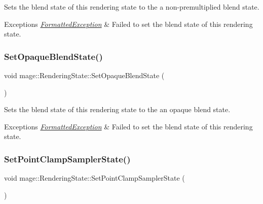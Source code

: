 Sets the blend state of this rendering state to the a non-\/premultiplied blend state.


\begin{DoxyExceptions}{Exceptions}
{\em \hyperlink{structmage_1_1_formatted_exception}{Formatted\+Exception}} & Failed to set the blend state of this rendering state. \\
\hline
\end{DoxyExceptions}
\hypertarget{structmage_1_1_rendering_state_ab0f578405f3c880234757e152be1a670}{}\label{structmage_1_1_rendering_state_ab0f578405f3c880234757e152be1a670} 
\subsubsection{\texorpdfstring{Set\+Opaque\+Blend\+State()}{SetOpaqueBlendState()}}
{\footnotesize\ttfamily void mage\+::\+Rendering\+State\+::\+Set\+Opaque\+Blend\+State (\begin{DoxyParamCaption}{ }\end{DoxyParamCaption})}

Sets the blend state of this rendering state to the an opaque blend state.


\begin{DoxyExceptions}{Exceptions}
{\em \hyperlink{structmage_1_1_formatted_exception}{Formatted\+Exception}} & Failed to set the blend state of this rendering state. \\
\hline
\end{DoxyExceptions}
\hypertarget{structmage_1_1_rendering_state_aabf9e70b12cb12560e6c6c880bbc08ca}{}\label{structmage_1_1_rendering_state_aabf9e70b12cb12560e6c6c880bbc08ca} 
\subsubsection{\texorpdfstring{Set\+Point\+Clamp\+Sampler\+State()}{SetPointClampSamplerState()}}
{\footnotesize\ttfamily void mage\+::\+Rendering\+State\+::\+Set\+Point\+Clamp\+Sampler\+State (\begin{DoxyParamCaption}{ }\end{DoxyParamCaption})}

